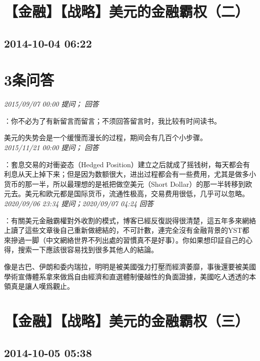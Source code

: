 \documentclass[twocolumn]{ctexart}
\begin{document}
\section{【金融】【战略】美元的金融霸权（二）}
\subsection{2014-10-04 06:22}


\section{3条问答}

\textit{\hfill\noindent\small 2015/09/07 00:00 提问； 回答}

：你不必为了有新留言而留言；不须回答留言时，我比较有时间读书。

美元的失势会是一个缓慢而漫长的过程，期间会有几百个小步骤。\\

\textit{\hfill\noindent\small 2015/11/21 00:00 提问； 回答}

：套息交易的对衝姿态（Hedged Position）建立之后就成了摇钱树，每天都会有利息从天上掉下来；但是因为数额很大，进出过程都会有一些费用，尤其是做多小货币的那一半，所以最理想的是衹把做空美元（Short Dollar）的那一半转移到欧元去。美元和欧元都是国际货币，流通性极高，交易费用很低，几乎可以忽略。\\

\textit{\hfill\noindent\small 2020/09/06 23:34 提问；2020/09/07 04:24 回答}

：有關美元金融霸權對外收割的模式，博客已經反復説得很清楚，這五年多來網絡上讀了這些文章後自己重新做總結的，不可計數，連完全沒有金融背景的YST都來摻過一脚（中文網絡世界不列出處的習慣真不是好事）。你如果想印証自己的心得，搜索一下應該很容易找到很多其他人的結論。

像是古巴、伊朗和委内瑞拉，明明是被美國强力打壓而經濟萎靡，事後還要被美國學術宣傳體系拿來做爲自由經濟和直選體制優越性的負面證據，美國吃人透透的本領真是讓人嘆爲觀止。
\\


\section{【金融】【战略】美元的金融霸权（三）}
\subsection{2014-10-05 05:38}
\end{document}
